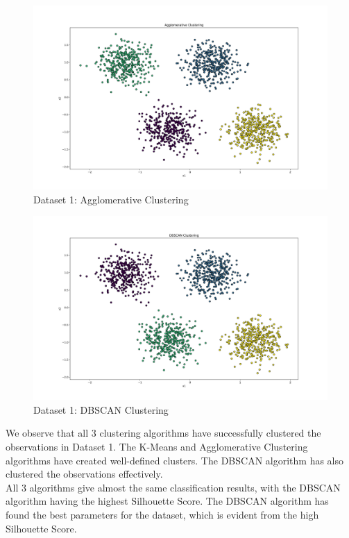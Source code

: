 \begin{figure}[H]
	\centering
	\includegraphics[width=0.9\linewidth]{Images/Clusters-5-v0-Agglomerative Clustering.png}
	\caption{Dataset 1: Agglomerative Clustering}
	\label{fig:clusters-5-v0-agglomerative-clustering}
\end{figure}

\begin{figure}[H]
	\centering
	\includegraphics[width=0.9\linewidth]{Images/Clusters-5-v0-DBSCAN Clustering.png}
	\caption{Dataset 1: DBSCAN Clustering}
	\label{fig:clusters-5-v0-dbscan-clustering}
\end{figure}

We observe that all 3 clustering algorithms have successfully clustered the observations in Dataset 1. The K-Means and Agglomerative Clustering algorithms have created well-defined clusters. The DBSCAN algorithm has also clustered the observations effectively. \\

All 3 algorithms give almost the same classification results, with the DBSCAN algorithm having the highest Silhouette Score. The DBSCAN algorithm has found the best parameters for the dataset, which is evident from the high Silhouette Score.

